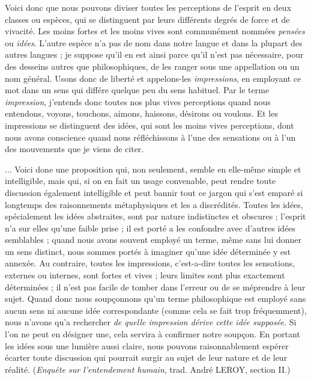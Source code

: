 Voici donc que nous pouvons diviser toutes les perceptions
de l’esprit en deux classes ou espèces, qui se distinguent
par leurs différents degrés de force et de vivacité.
Les moins fortes et les moins vives sont communément
nommées {\it pensées} ou {\it idées}. L’autre espèce n’a pas de nom
dans notre langue et dans la plupart des autres langues ;
je suppose qu’il en est ainsi parce qu’il n’est pas nécessaire,
pour des desseins autres que philosophiques, de
les ranger sous une appellation ou un nom général. Usons
donc de liberté et appelons-les {\it impressions}, en employant
ce mot dans un sens qui différe quelque peu du sens
habituel. Par le terme {\it impression}, j’entends donc toutes
nos plus vives perceptions quand nous entendons, voyons,
touchons, aimons, haissons, désirons ou voulons. Et les
impressions se distinguent des idées, qui sont les moins
vives perceptions, dont nous avons conscience quand
nous réfléchissons à l’une des sensations ou à l’un des
mouvements que je viens de citer.

... Voici done une proposition qui, non seulement,
semble en elle-même simple et intelligible, mais qui, si
on en fait un usage convenable, peut rendre toute discussion
également intelligible et peut bannir tout ce
jargon qui s’est emparé si longtemps des raisonnements
métaphysiques et les a discrédités. Toutes les idées, spécialement
les idées abstraites, sont par nature indistinctes
et obscures ; l’esprit n’a sur elles qu’une faible prise ;
il est porté a les confondre avec d’autres idées semblables ;
quand nous avons souvent employé un terme, même sans
lui donner un sens distinct, nous sommes portés à imaginer
qu’une idée déterminée y est annexée. Au contraire,
toutes les impressions, c’est-a-dire toutes les sensations,
externes ou internes, sont fortes et vives ; leurs limites
sont plus exactement déterminées ; il n’est pas facile de
tomber dans l’erreur ou de se méprendre à leur sujet.
Quand donc nous soupçonnons qu’un terme philosophique
est employé sans aucun sens ni aucune idée correspondante
(comme cela se fait trop fréquemment), nous n’avons
qu’a rechercher {\it de quelle impression dérive cette idée supposée.}
Si l’on ne peut en désigner une, cela servira à confirmer
notre soupçon. En portant les idées sous une lumière
aussi claire, nous pouvons raisonnablement espérer
écarter toute discussion qui pourrait surgir au sujet de
leur nature et de leur réalité. ({\it Enquête sur l’entendement
humain}, trad. André L{\footnotesize EROY}, section II.)

